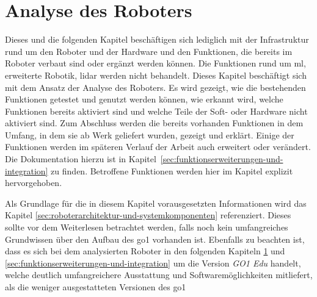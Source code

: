 \section{Analyse des Roboters}
\label{sec:analyse-des-roboters}

Dieses und die folgenden Kapitel beschäftigen sich lediglich mit der Infrastruktur rund um den Roboter
und der Hardware und den Funktionen, die bereits im Roboter verbaut sind oder ergänzt werden können.
Die Funktionen rund um \gls{ml}, erweiterte Robotik, \gls{lidar} werden nicht behandelt.
Dieses Kapitel beschäftigt sich mit dem Ansatz der Analyse des Roboters.
Es wird gezeigt, wie die bestehenden Funktionen getestet und genutzt werden können, wie erkannt wird,
welche Funktionen bereits aktiviert sind und welche Teile der Soft- oder Hardware nicht aktiviert sind.
Zum Abschluss werden die bereits vorhanden Funktionen in dem Umfang, in dem sie ab Werk geliefert wurden,
gezeigt und erklärt.
Einige der Funktionen werden im späteren Verlauf der Arbeit auch erweitert oder verändert.
Die Dokumentation hierzu ist in Kapitel~\ref{sec:funktionserweiterungen-und-integration} zu finden.
Betroffene Funktionen werden hier im Kapitel explizit hervorgehoben.


Als Grundlage für die in diesem Kapitel vorausgesetzten Informationen wird das Kapitel \ref{sec:roboterarchitektur-und-systemkomponenten}
referenziert.
Dieses sollte vor dem Weiterlesen betrachtet werden, falls noch kein umfangreiches Grundwissen über den Aufbau des \gls{go1}
vorhanden ist.
Ebenfalls zu beachten ist, dass es sich bei dem analysierten Roboter in den folgenden Kapiteln \ref{sec:analyse-des-roboters}
und \ref{sec:funktionserweiterungen-und-integration} um die Version \emph{GO1 Edu} handelt, welche deutlich umfangreichere
Ausstattung und Softwaremöglichkeiten mitliefert, als die weniger ausgestatteten Versionen des \gls{go1}













